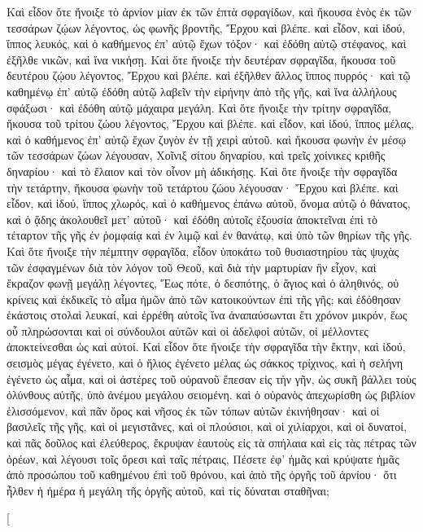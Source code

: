 \begin{pages}
    \begin{Leftside}
        \beginnumbering
		Καὶ εἶδον ὅτε ἤνοιξε τὸ ἀρνίον μίαν ἐκ τῶν ἑπτὰ σφραγίδων, καὶ ἤκουσα ἑνὸς ἐκ τῶν τεσσάρων ζῴων λέγοντος, ὡς φωνῆς βροντῆς, Ἔρχου καὶ βλέπε. καὶ εἶδον, καὶ ἰδού, ἵππος λευκός, καὶ ὁ καθήμενος ἐπ’ αὐτῷ ἔχων τόξον· καὶ ἐδόθη αὐτῷ στέφανος, καὶ ἐξῆλθε νικῶν, καὶ ἵνα νικήσῃ.
		\pend
		\pstart
		Καὶ ὅτε ἤνοιξε τὴν δευτέραν σφραγῖδα, ἤκουσα τοῦ δευτέρου ζῴου λέγοντος, Ἔρχου καὶ βλέπε. καὶ ἐξῆλθεν ἄλλος ἵππος πυρρός· καὶ τῷ καθημένῳ ἐπ’ αὐτῷ ἐδόθη αὐτῷ λαβεῖν τὴν εἰρήνην ἀπὸ τῆς γῆς, καὶ ἵνα ἀλλήλους σφάξωσι· καὶ ἐδόθη αὐτῷ μάχαιρα μεγάλη.
		\pend
		\pstart
		Καὶ ὅτε ἤνοιξε τὴν τρίτην σφραγῖδα, ἤκουσα τοῦ τρίτου ζώου λέγοντος, Ἔρχου καὶ βλέπε. καὶ εἶδον, καὶ ἰδού, ἵππος μέλας, καὶ ὁ καθήμενος ἐπ’ αὐτῷ ἔχων ζυγὸν ἐν τῇ χειρὶ αὐτοῦ. καὶ ἤκουσα φωνὴν ἐν μέσῳ τῶν τεσσάρων ζώων λέγουσαν, Χοῖνιξ σίτου δηναρίου, καὶ τρεῖς χοίνικες κριθῆς δηναρίου· καὶ τὸ ἔλαιον καὶ τὸν οἶνον μὴ ἀδικήσῃς.
		\pend
		\pstart
		Καὶ ὅτε ἤνοιξε τὴν σφραγῖδα τὴν τετάρτην, ἤκουσα φωνὴν τοῦ τετάρτου ζώου λέγουσαν· Ἔρχου καὶ βλέπε. καὶ εἶδον, καὶ ἰδού, ἵππος χλωρός, καὶ ὁ καθήμενος ἐπάνω αὐτοῦ, ὄνομα αὐτῷ ὁ θάνατος, καὶ ὁ ᾅδης ἀκολουθεῖ μετ’ αὐτοῦ· καὶ ἐδόθη αὐτοῖς ἐξουσία ἀποκτεῖναι ἐπὶ τὸ τέταρτον τῆς γῆς ἐν ῥομφαίᾳ καὶ ἐν λιμῷ καὶ ἐν θανάτῳ, καὶ ὑπὸ τῶν θηρίων τῆς γῆς.
		\pend
		\pstart
		Καὶ ὅτε ἤνοιξε τὴν πέμπτην σφραγῖδα, εἶδον ὑποκάτω τοῦ θυσιαστηρίου τὰς ψυχὰς τῶν ἐσφαγμένων διὰ τὸν λόγον τοῦ Θεοῦ, καὶ διὰ τὴν μαρτυρίαν ἣν εἶχον, καὶ ἔκραζον φωνῇ μεγάλῃ λέγοντες, Ἕως πότε, ὁ δεσπότης, ὁ ἅγιος καὶ ὁ ἀληθινός, οὐ κρίνεις καὶ ἐκδικεῖς τὸ αἷμα ἡμῶν ἀπὸ τῶν κατοικούντων ἐπὶ τῆς γῆς; καὶ ἐδόθησαν ἑκάστοις στολαὶ λευκαί, καὶ ἐρρέθη αὐτοῖς ἵνα ἀναπαύσωνται ἔτι χρόνον μικρόν, ἕως οὗ πληρώσονται καὶ οἱ σύνδουλοι αὐτῶν καὶ οἱ ἀδελφοὶ αὐτῶν, οἱ μέλλοντες ἀποκτείνεσθαι ὡς καὶ αὐτοί.
		\pend
		\pstart
		Καὶ εἶδον ὅτε ἤνοιξε τὴν σφραγῖδα τὴν ἕκτην, καὶ ἰδού, σεισμὸς μέγας ἐγένετο, καὶ ὁ ἥλιος ἐγένετο μέλας ὡς σάκκος τρίχινος, καὶ ἡ σελήνη ἐγένετο ὡς αἷμα, καὶ οἱ ἀστέρες τοῦ οὐρανοῦ ἔπεσαν εἰς τὴν γῆν, ὡς συκῆ βάλλει τοὺς ὀλύνθους αὐτῆς, ὑπὸ ἀνέμου μεγάλου σειομένη. καὶ ὁ οὐρανὸς ἀπεχωρίσθη ὡς βιβλίον ἑλισσόμενον, καὶ πᾶν ὄρος καὶ νῆσος ἐκ τῶν τόπων αὐτῶν ἐκινήθησαν· 
		\pend
		\pstart
		καὶ οἱ βασιλεῖς τῆς γῆς, καὶ οἱ μεγιστᾶνες, καὶ οἱ πλούσιοι, καὶ οἱ χιλίαρχοι, καὶ οἱ δυνατοί, καὶ πᾶς δοῦλος καὶ ἐλεύθερος, ἔκρυψαν ἑαυτοὺς εἰς τὰ σπήλαια καὶ εἰς τὰς πέτρας τῶν ὀρέων, καὶ λέγουσι τοῖς ὄρεσι καὶ ταῖς πέτραις, Πέσετε ἐφ’ ἡμᾶς καὶ κρύψατε ἡμᾶς ἀπὸ προσώπου τοῦ καθημένου ἐπὶ τοῦ θρόνου, καὶ ἀπὸ τῆς ὀργῆς τοῦ ἀρνίου· ὅτι ἦλθεν ἡ ἡμέρα ἡ μεγάλη τῆς ὀργῆς αὐτοῦ, καὶ τίς δύναται σταθῆναι;
		\pend
        \endnumbering
    \end{Leftside}
    \begin{Rightside}
        \beginnumbering
        \pstart[

\end{Rightside}
\end{pages}
